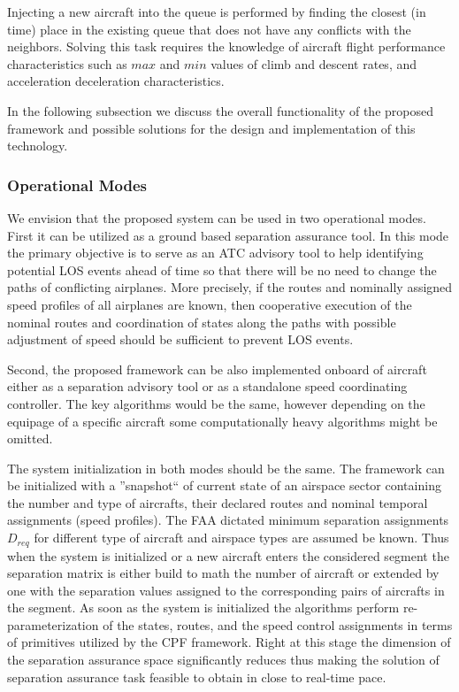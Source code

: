 \documentclass[letter,onecolumn,12pt]{aiaa-tc}
\newcommand{\1}{1_n}
\begin{document}
\begin{itemize}
Injecting a new aircraft into the queue is performed by finding the closest (in time) place in the existing queue that does not have any conflicts with the neighbors. Solving this task requires the knowledge of aircraft flight performance characteristics such as $max$ and $min$ values of climb and descent rates, and acceleration deceleration characteristics.

\end{itemize}

In the  following subsection we discuss the overall functionality of the proposed framework and possible solutions for the design and implementation of this technology.

\subsubsection{Operational Modes}

We envision that the proposed system can be used in two operational modes. First it can be utilized as a ground based separation assurance tool. In this mode the primary objective is to serve as an ATC advisory tool to help identifying potential LOS events ahead of time so that there will be no need to change the paths of conflicting airplanes. More precisely, if the routes and nominally assigned speed profiles of all airplanes are known, then cooperative execution of the nominal routes and coordination of states along the paths with possible adjustment of speed should be sufficient to prevent LOS events.

Second, the proposed framework can be also implemented onboard of aircraft either as a separation advisory tool or as a standalone speed coordinating controller. The key algorithms would be the same, however depending on the equipage of a specific aircraft some computationally heavy algorithms might be omitted.

The system initialization in both modes should be the same. The framework can be initialized with a ''snapshot`` of current state of an airspace sector containing the number and type of aircrafts, their declared routes and nominal temporal assignments (speed profiles). The FAA dictated minimum separation assignments $D_{req}$ for different type of aircraft and airspace types are assumed be known. Thus when the system is initialized or a new aircraft enters the considered segment the separation matrix is either build to math the number of aircraft or extended by one with the  separation values assigned to the corresponding pairs of aircrafts in the segment. As soon as the system is initialized the algorithms perform re-parameterization of the states, routes, and the speed control assignments in terms of primitives utilized by the CPF framework. Right at this stage the dimension of the separation assurance space significantly reduces thus making the solution of separation assurance task feasible to obtain in close to real-time pace.
\end{document}
